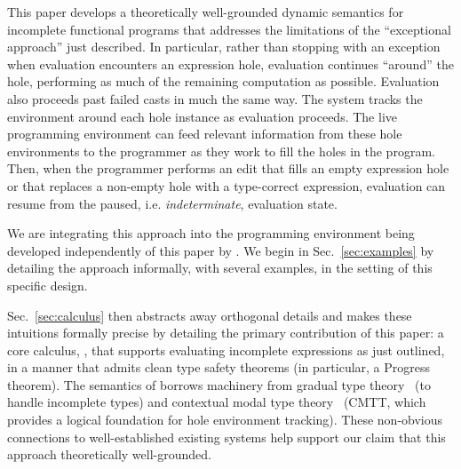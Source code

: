 
This paper develops a theoretically well-grounded dynamic semantics for incomplete functional programs that addresses the limitations of the ``exceptional approach'' just described. 
In particular, rather than stopping with an exception when evaluation encounters an expression hole, evaluation continues ``around'' the hole, performing as much of the remaining computation as possible. 
Evaluation also proceeds past failed casts in much the same way. 
The system tracks the environment around each hole instance as evaluation proceeds. 
The live programming environment can feed relevant information from these hole environments to the programmer as they work to fill the holes in the program. 
Then, when the programmer performs an edit that fills an empty expression hole or that replaces a non-empty hole with a type-correct expression, evaluation can resume from the paused, i.e. \emph{indeterminate}, evaluation state.


\newcommand{\contribution}[2]{\paragraph{#1. #2}} 

We are integrating this approach into the \Hazel programming environment being developed independently of this paper by \citet{HazelnutSNAPL}. 
We begin in Sec.~\ref{sec:examples} by detailing the approach informally, with several examples, in the setting of this specific design.

Sec.~\ref{sec:calculus} then abstracts away orthogonal details and makes these intuitions formally precise by detailing the primary contribution of this paper: a core calculus, \HazelnutLive, that supports evaluating incomplete expressions as just outlined, in a manner that admits clean type safety theorems (in particular, a Progress theorem). The semantics of \HazelnutLive borrows machinery from gradual type theory~\cite{DBLP:conf/snapl/SiekVCB15,Siek06a}
(to handle incomplete types) and contextual modal type theory~\cite{Nanevski2008} (CMTT,
which provides a logical foundation for hole environment tracking). 
These non-obvious connections to well-established existing systems help support our claim that this approach \IS theoretically well-grounded.

